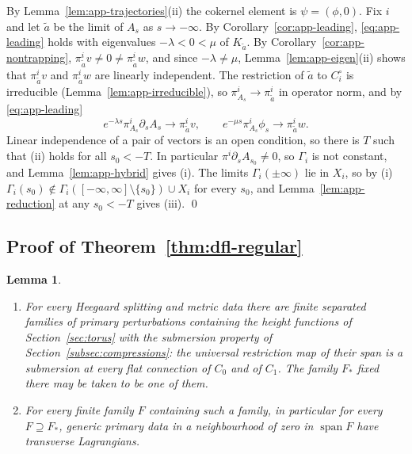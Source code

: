 \documentclass[11pt]{amsart}
\newtheorem{lemma}[theorem]{Lemma}
\theoremstyle{definition}
\theoremstyle{remark}
\theoremstyle{plain}
\numberwithin{equation}{section}
\begin{document}
By Lemma~\ref{lem:app-trajectories}(ii) the cokernel element is $\psi=(\phi,0)$. Fix $i$ and let
$\tilde a$ be the limit of $A_s$ as $s\to-\infty$. By Corollary~\ref{cor:app-leading},
\eqref{eq:app-leading} holds with eigenvalues $-\lambda<0<\mu$ of $K_{\tilde a}$. By
Corollary~\ref{cor:app-nontrapping}, $\pi^i_{\tilde a}v\ne0\ne\pi^i_{\tilde a}w$, and since
$-\lambda\ne\mu$, Lemma~\ref{lem:app-eigen}(ii) shows that $\pi^i_{\tilde a}v$ and
$\pi^i_{\tilde a}w$ are linearly independent. The restriction of $\tilde a$ to $C_i^\circ$ is
irreducible (Lemma~\ref{lem:app-irreducible}), so $\pi^i_{A_s}\to\pi^i_{\tilde a}$ in operator norm,
and by \eqref{eq:app-leading}
\[
e^{-\lambda s}\pi^i_{A_s}\partial_sA_s\to\pi^i_{\tilde a}v,\qquad
e^{-\mu s}\pi^i_{A_s}\phi_s\to\pi^i_{\tilde a}w .
\]
Linear independence of a pair of vectors is an open condition, so there is $T$ such that (ii)
holds for all $s_0<-T$. In particular $\pi^i\partial_sA_{s_0}\ne0$, so $\Gamma_i$ is not constant,
and Lemma~\ref{lem:app-hybrid} gives (i). The limits $\Gamma_i(\pm\infty)$ lie in $X_i$, so by (i)
$\Gamma_i(s_0)\notin\Gamma_i([-\infty,\infty]\setminus\{s_0\})\cup X_i$ for every $s_0$, and
Lemma~\ref{lem:app-reduction} at any $s_0<-T$ gives (iii). \qed

\subsection{Proof of Theorem~\ref{thm:dfl-regular}}

\begin{lemma}\label{lem:app-separated}
\begin{enumerate}[label=(\roman*)]
\item For every Heegaard splitting and metric data there are finite separated families of
  primary perturbations containing the height functions of Section~\ref{sec:torus} with the
  submersion property of Section~\ref{subsec:compressions}: the
  universal restriction map of their span is a submersion at every flat connection of $C_0$ and
  of $C_1$. The family $F_*$ fixed there may be taken to be one of them.
\item For every finite family $F$ containing such a family, in particular for every
  $F\supseteq F_*$, generic primary data in a
  neighbourhood of zero in $\operatorname{span}F$ have transverse Lagrangians.
\end{enumerate}
\end{lemma}
\end{document}
